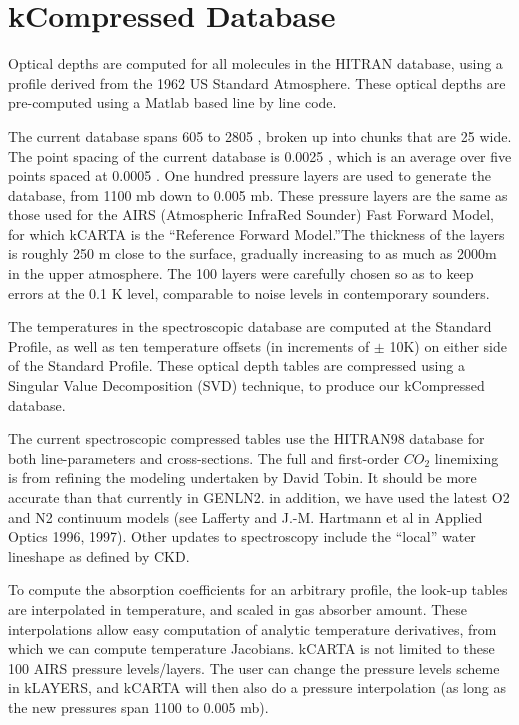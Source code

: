 \documentclass[12pt]{article}
\newcommand{\kc}{\textsf{kCARTA}\xspace}
\newcommand{\kl}{\textsf{kLAYERS}\xspace}
\begin{document}
\section{kCompressed Database}

Optical depths are computed for all molecules in the HITRAN database, using
a profile derived from the 1962 US Standard Atmosphere. These optical
depths are pre-computed using a Matlab based line by line code.

The current database spans 605 \wn to 2805 \wn, broken up into chunks
that are 25 \wn wide. The point spacing of the current database is 0.0025 \wn,
which is an average over five points spaced at 0.0005 \wn.
One hundred pressure layers are used to generate the 
database, from 1100 mb down to 0.005 mb.  These pressure layers are the same 
as those used for the AIRS (Atmospheric InfraRed Sounder) Fast Forward Model, 
for which \kc is the ``Reference Forward Model.''The thickness of the layers 
is roughly 250 m close to the surface, gradually increasing to as much as 
2000m in the upper atmosphere. The 100 layers were carefully chosen so as to 
keep errors at the 0.1 K level, comparable to noise levels in contemporary 
sounders.

The temperatures in the spectroscopic database are computed at the Standard 
Profile, as well as ten temperature offsets (in increments of $\pm$ 10K) on 
either side of the Standard Profile. These optical depth tables are compressed
using a Singular Value Decomposition ({\sf SVD}) technique, to produce our 
{\sf kCompressed} database.  

The current spectroscopic compressed
tables use the {\sf HITRAN98} database for both line-parameters and
cross-sections.  The full and first-order $CO_{2}$ linemixing is from 
refining the modeling undertaken by David Tobin. It should be more accurate 
than that currently in {\sf GENLN2}. in addition, we have used the latest
O2 and N2 continuum models (see Lafferty and J.-M. Hartmann et al in Applied 
Optics 1996, 1997). Other updates to spectroscopy include the ``local'' 
water lineshape as defined by CKD.

To compute the absorption coefficients for an arbitrary profile, the look-up 
tables are interpolated in temperature, and scaled in gas absorber amount.  
These interpolations allow easy computation of analytic temperature 
derivatives, from which we can compute temperature Jacobians. \kc is not 
limited to these 100 AIRS pressure levels/layers. The user can change the 
pressure levels scheme in \kl, and \kc will then also do a pressure 
interpolation (as long as the new pressures span 1100 to 0.005 mb). 
\end{document}

